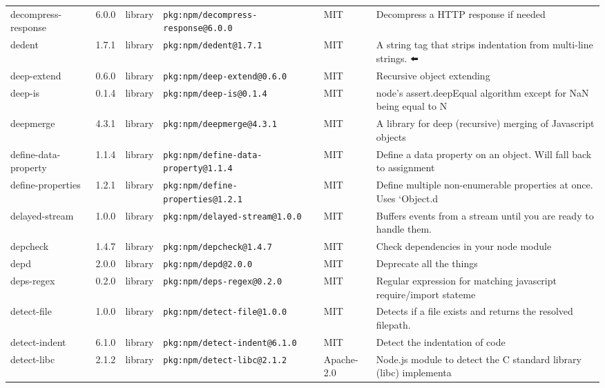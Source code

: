 \documentclass[11pt,a4paper]{article}
\begin{document}
\begin{longtable}{|p{4cm}|p{2cm}|p{1.6cm}|p{5cm}|p{1.5cm}|p{3.5cm}|}
\raggedright decompress-response & 6.0.0 & library & \small\texttt{pkg:npm/decompress-response@6.0.0} & MIT & \small Decompress a HTTP response if needed \\
\raggedright dedent & 1.7.1 & library & \small\texttt{pkg:npm/dedent@1.7.1} & MIT & \small A string tag that strips indentation from multi-line strings. ⬅️ \\
\raggedright deep-extend & 0.6.0 & library & \small\texttt{pkg:npm/deep-extend@0.6.0} & MIT & \small Recursive object extending \\
\raggedright deep-is & 0.1.4 & library & \small\texttt{pkg:npm/deep-is@0.1.4} & MIT & \small node's assert.deepEqual algorithm except for NaN being equal to N \\
\raggedright deepmerge & 4.3.1 & library & \small\texttt{pkg:npm/deepmerge@4.3.1} & MIT & \small A library for deep (recursive) merging of Javascript objects \\
\raggedright define-data-property & 1.1.4 & library & \small\texttt{pkg:npm/define-data-property@1.1.4} & MIT & \small Define a data property on an object. Will fall back to assignment \\
\raggedright define-properties & 1.2.1 & library & \small\texttt{pkg:npm/define-properties@1.2.1} & MIT & \small Define multiple non-enumerable properties at once. Uses `Object.d \\
\raggedright delayed-stream & 1.0.0 & library & \small\texttt{pkg:npm/delayed-stream@1.0.0} & MIT & \small Buffers events from a stream until you are ready to handle them. \\
\raggedright depcheck & 1.4.7 & library & \small\texttt{pkg:npm/depcheck@1.4.7} & MIT & \small Check dependencies in your node module \\
\raggedright depd & 2.0.0 & library & \small\texttt{pkg:npm/depd@2.0.0} & MIT & \small Deprecate all the things \\
\raggedright deps-regex & 0.2.0 & library & \small\texttt{pkg:npm/deps-regex@0.2.0} & MIT & \small Regular expression for matching javascript require/import stateme \\
\raggedright detect-file & 1.0.0 & library & \small\texttt{pkg:npm/detect-file@1.0.0} & MIT & \small Detects if a file exists and returns the resolved filepath. \\
\raggedright detect-indent & 6.1.0 & library & \small\texttt{pkg:npm/detect-indent@6.1.0} & MIT & \small Detect the indentation of code \\
\raggedright detect-libc & 2.1.2 & library & \small\texttt{pkg:npm/detect-libc@2.1.2} & Apache-2.0 & \small Node.js module to detect the C standard library (libc) implementa \\

\end{longtable}
\end{document}
